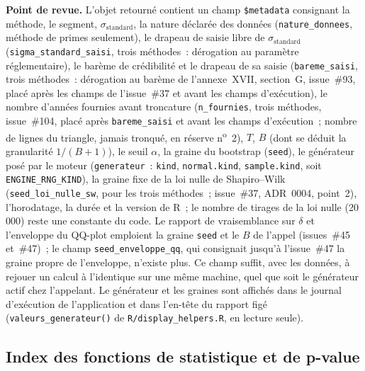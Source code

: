 \documentclass[a4paper,11pt]{article}
\newcommand{\code}[1]{\texttt{\small #1}}
\begin{document}
\begin{encadre}
\textbf{Point de revue.} L'objet retourné contient un champ \code{\$metadata}
consignant la méthode, le segment, $\sigma_{\text{standard}}$, la nature déclarée des données
(\code{nature\_donnees}, méthode de primes seulement), le drapeau de saisie libre de
$\sigma_{\text{standard}}$ (\code{sigma\_standard\_saisi}, trois méthodes~: dérogation au
paramètre réglementaire), le barème de
crédibilité et le drapeau de sa saisie (\code{bareme\_saisi}, trois méthodes~: dérogation au
barème de l'annexe~XVII, section~G, issue~\#93, placé après les champs de l'issue~\#37 et avant
les champs d'exécution), le nombre d'années fournies avant troncature (\code{n\_fournies}, trois
méthodes, issue~\#104, placé après \code{bareme\_saisi} et avant les champs d'exécution~;
nombre de lignes du triangle, jamais tronqué, en réserve n\textsuperscript{o}~2), $T$, $B$ (dont se déduit la granularité $1/(B+1)$), le seuil
$\alpha$, la graine du bootstrap (\code{seed}), le générateur posé par le moteur
(\code{generateur}~: \code{kind}, \code{normal.kind}, \code{sample.kind}, soit
\code{ENGINE\_RNG\_KIND}), la graine fixe de la loi nulle de Shapiro--Wilk
(\code{seed\_loi\_nulle\_sw}, pour les trois méthodes~; issue~\#37, ADR~0004, point~2),
l'horodatage, la durée et la version de R~; le nombre de tirages de la loi nulle (20\,000) reste
une constante du code. Le rapport de vraisemblance sur $\delta$ et l'enveloppe du QQ-plot
emploient la graine \code{seed} et le $B$ de l'appel (issues~\#45 et~\#47)~; le champ
\code{seed\_enveloppe\_qq}, qui consignait jusqu'à l'issue~\#47 la graine propre de l'enveloppe,
n'existe plus. Ce champ suffit, avec les données, à rejouer un calcul à l'identique sur une
même machine, quel que soit le générateur actif chez l'appelant. Le générateur et les graines
sont affichés dans le journal d'exécution de l'application et dans l'en-tête du rapport figé
(\code{valeurs\_generateur()} de \code{R/display\_helpers.R}, en lecture seule).
\end{encadre}

\subsection{Index des fonctions de statistique et de p-value}
\label{sec:index-fonctions}
\end{document}
